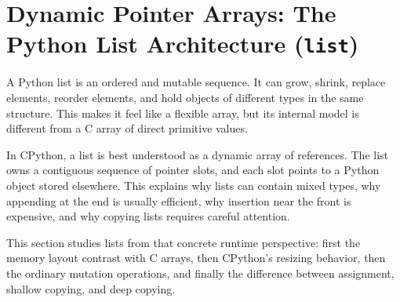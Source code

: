 \section{Dynamic Pointer Arrays: The Python List Architecture (\texttt{list})}

A Python list is an ordered and mutable sequence. It can grow, shrink, replace elements, reorder elements, and hold objects of different types in the same structure. This makes it feel like a flexible array, but its internal model is different from a C array of direct primitive values.

In CPython, a list is best understood as a dynamic array of references. The list owns a contiguous sequence of pointer slots, and each slot points to a Python object stored elsewhere. This explains why lists can contain mixed types, why appending at the end is usually efficient, why insertion near the front is expensive, and why copying lists requires careful attention.

This section studies lists from that concrete runtime perspective: first the memory layout contrast with C arrays, then CPython's resizing behavior, then the ordinary mutation operations, and finally the difference between assignment, shallow copying, and deep copying.
